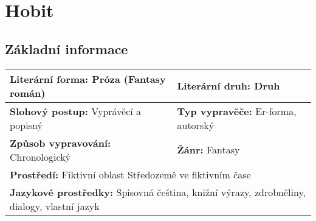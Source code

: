 \section{Hobit}
\label{sec:hobit}
\subsection*{Základní informace}
\begin{tabularx}{\linewidth}{l|l}
    \textbf{Literární forma:} Próza (Fantasy román) & \textbf{Literární druh:} Druh                                        \\
    \hline
    \textbf{Slohový postup:} Vyprávěcí a popisný    & \textbf{Typ vypravěče:} Er-forma, autorský                           \\
    \hline
    \textbf{Způsob vypravování:} Chronologický      & \textbf{Žánr:} Fantasy                                               \\
    \hline
    \multicolumn{2}{l}{\textbf{Prostředí:} Fiktivní oblast Středozemě ve fiktivním čase}                                   \\
    \hline
    \multicolumn{2}{l}{\textbf{Jazykové prostředky:} Spisovná čeština, knižní výrazy, zdrobněliny, dialogy, vlastní jazyk} \\
\end{tabularx}
